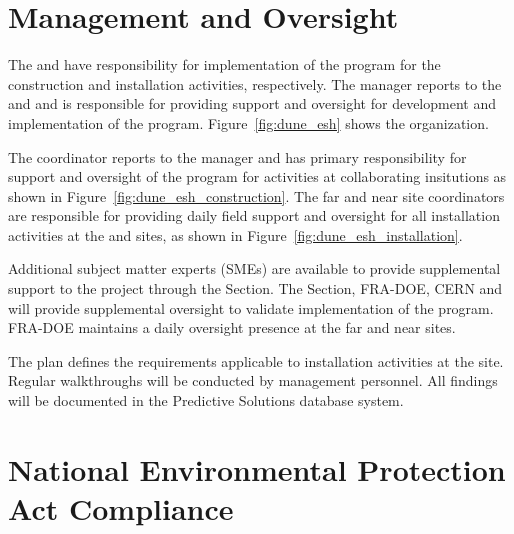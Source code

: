 \section{  Management and Oversight}

The  and  have responsibility for
implementation of the   program for the construction and installation activities, respectively.  The
  manager reports to the
 and  and is responsible for providing
 support and oversight for development and implementation of the 
  program. Figure~\ref{fig:dune_esh} shows
the   organization.


The   coordinator reports to the
  manager and has primary responsibility
for  support and oversight of the  
program for activities at collaborating insitutions as shown in
Figure~\ref{fig:dune_esh_construction}.  The far and near site
 coordinators are responsible for providing daily field support and
oversight for all installation activities at the 
and  sites, as shown in Figure~\ref{fig:dune_esh_installation}.

Additional  subject matter experts (SMEs) are available to
provide supplemental support to the project through the \fnal
{} Section. The \fnal {} Section, FRA-DOE, CERN and
 will provide supplemental  oversight to
validate implementation of the  
program. FRA-DOE maintains a daily oversight presence at the far and
near sites.

The   plan defines the 
requirements applicable to installation activities at the 
site. Regular  walkthroughs will be conducted by
  management personnel. All
findings will be documented in the \fnal Predictive Solutions
database system.

\section{National Environmental Protection Act Compliance}

